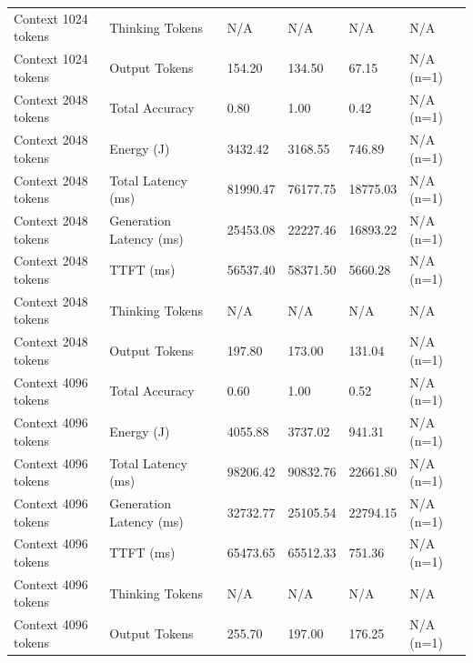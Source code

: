 \begin{table}
\begin{tabular}{llllll}
Context 1024 tokens & Thinking Tokens & N/A & N/A & N/A & N/A \\
Context 1024 tokens & Output Tokens & 154.20 & 134.50 & 67.15 & N/A (n=1) \\
Context 2048 tokens & Total Accuracy & 0.80 & 1.00 & 0.42 & N/A (n=1) \\
Context 2048 tokens & Energy (J) & 3432.42 & 3168.55 & 746.89 & N/A (n=1) \\
Context 2048 tokens & Total Latency (ms) & 81990.47 & 76177.75 & 18775.03 & N/A (n=1) \\
Context 2048 tokens & Generation Latency (ms) & 25453.08 & 22227.46 & 16893.22 & N/A (n=1) \\
Context 2048 tokens & TTFT (ms) & 56537.40 & 58371.50 & 5660.28 & N/A (n=1) \\
Context 2048 tokens & Thinking Tokens & N/A & N/A & N/A & N/A \\
Context 2048 tokens & Output Tokens & 197.80 & 173.00 & 131.04 & N/A (n=1) \\
Context 4096 tokens & Total Accuracy & 0.60 & 1.00 & 0.52 & N/A (n=1) \\
Context 4096 tokens & Energy (J) & 4055.88 & 3737.02 & 941.31 & N/A (n=1) \\
Context 4096 tokens & Total Latency (ms) & 98206.42 & 90832.76 & 22661.80 & N/A (n=1) \\
Context 4096 tokens & Generation Latency (ms) & 32732.77 & 25105.54 & 22794.15 & N/A (n=1) \\
Context 4096 tokens & TTFT (ms) & 65473.65 & 65512.33 & 751.36 & N/A (n=1) \\
Context 4096 tokens & Thinking Tokens & N/A & N/A & N/A & N/A \\
Context 4096 tokens & Output Tokens & 255.70 & 197.00 & 176.25 & N/A (n=1) \\
\bottomrule
\end{tabular}
\end{table}
